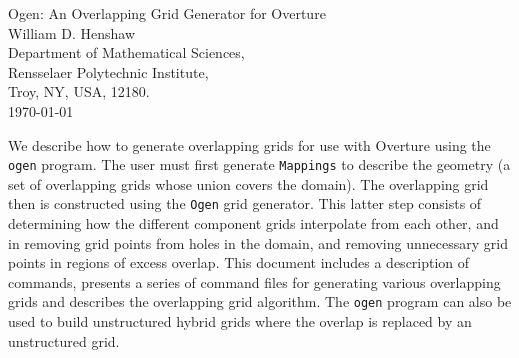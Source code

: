 \documentclass[xcolor=rgb,svgnames,dvipsnames]{article}
\begin{document}
\baselineskip
{}
\begin{flushleft}
{\Large
Ogen: An Overlapping Grid Generator for Overture \\
}
\vspace{2\baselineskip}
William D. Henshaw  \\
Department of Mathematical Sciences, \\
Rensselaer Polytechnic Institute, \\
Troy, NY, USA, 12180. \\
\vspace{2\baselineskip}
\today 

\vspace{4\baselineskip}



We describe how to generate overlapping grids for use with Overture using the
{\tt ogen} program. The user must first generate {\tt Mappings} to describe the
geometry (a set of overlapping grids whose union covers the domain). The overlapping
grid then is constructed using the {\tt Ogen} grid generator. This latter step consists
of determining how the different component grids interpolate from each other, and in
removing grid points from holes in the domain, and removing unnecessary grid points 
in regions of excess overlap. This document includes a description of commands, presents
a series of command files for generating various overlapping grids and describes the
overlapping grid algorithm. The {\tt ogen} program can also be used to build unstructured
hybrid grids where the overlap is replaced by an unstructured grid.
\end{flushleft}
\end{document}

